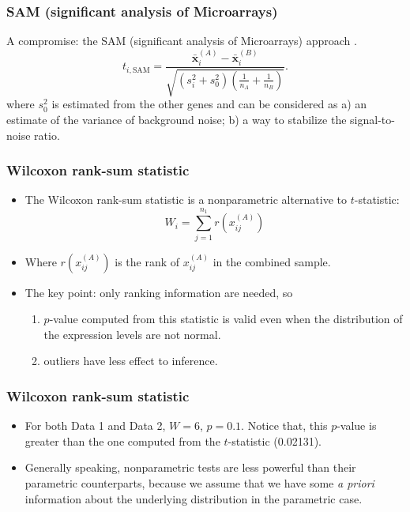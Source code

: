 \begin{frame}
  \frametitle{SAM (significant analysis of Microarrays)} A compromise:
  the SAM (significant analysis of Microarrays) approach
  \cite{Tusher2001}.
    \begin{equation}
      \label{eq:sam}
      t_{i,\text{SAM}} = \frac{\bar{\mathbf{x}}^{(A)}_{i}-\bar{\mathbf{x}}^{(B)}_{i}} {\sqrt{(s^2_i + s^{2}_{0})(\frac{1}{n_{A}}+\frac{1}{n_{B}})}}.
    \end{equation}
    where $s^{2}_{0}$ is estimated from the other genes and can be
    considered as a) an estimate of the variance of background noise;
    b) a way to stabilize the signal-to-noise ratio.
\end{frame}

\begin{frame}
  \frametitle{Wilcoxon rank-sum statistic}
  \begin{itemize}
  \item The Wilcoxon rank-sum statistic is a nonparametric alternative
    to $t$-statistic:
    \begin{equation}
      \label{eq:wilcoxon}
      W_{i} = \sum^{n_1}_{j=1} r(x^{(A)}_{ij})
    \end{equation}
  \item Where $r(x^{(A)}_{ij})$ is the rank of $x^{(A)}_{ij}$ in the
    combined sample.
  \item The key point: only ranking information are needed, so
    \begin{enumerate}
    \item $p$-value computed from this statistic is valid even when
      the distribution of the expression levels are not normal.
      \cite{Gibbons1992NonparametricStatisticalInference}
    \item outliers have less effect to inference.
    \end{enumerate}
  \end{itemize}
\end{frame}

\begin{frame}
  \frametitle{Wilcoxon rank-sum statistic} 
  \begin{itemize}
  \item For both Data 1 and Data 2, $W=6$, $p=0.1$. Notice that, this
    $p$-value is greater than the one computed from the $t$-statistic
    (0.02131).
  \item Generally speaking, nonparametric tests are less powerful than
    their parametric counterparts, because we assume that we have some
    \textit{a priori} information about the underlying distribution in
    the parametric case.
  \end{itemize}
\end{frame}

